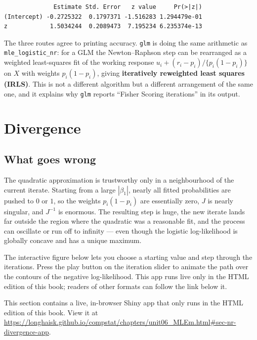 \documentclass[
  letterpaper,
  DIV=11,
  numbers=noendperiod]{scrreprt}
\begin{document}
\begin{verbatim}
              Estimate Std. Error   z value     Pr(>|z|)
(Intercept) -0.2725322  0.1797371 -1.516283 1.294479e-01
z            1.5034244  0.2089473  7.195234 6.235374e-13
\end{verbatim}

The three routes agree to printing accuracy. \texttt{glm} is doing the
same arithmetic as \texttt{mle\_logistic\_nr}: for a GLM the
Newton--Raphson step can be rearranged as a weighted least-squares fit
of the working response \(u_i + (r_i - p_i)/\{p_i(1-p_i)\}\) on \(X\)
with weights \(p_i(1-p_i)\), giving \textbf{iteratively reweighted least
squares (IRLS)}. This is not a different algorithm but a different
arrangement of the same one, and it explains why \texttt{glm} reports
``Fisher Scoring iterations'' in its output.

\section{Divergence}\label{sec-divergence}

\subsection{What goes wrong}\label{what-goes-wrong}

The quadratic approximation is trustworthy only in a neighbourhood of
the current iterate. Starting from a large \(|\beta_1|\), nearly all
fitted probabilities are pushed to \(0\) or \(1\), so the weights
\(p_i(1-p_i)\) are essentially zero, \(J\) is nearly singular, and
\(J^{-1}\) is enormous. The resulting step is huge, the new iterate
lands far outside the region where the quadratic was a reasonable fit,
and the process can oscillate or run off to infinity --- even though the
logistic log-likelihood is globally concave and has a unique maximum.

The interactive figure below lets you choose a starting value and step
through the iterations. Press the play button on the iteration slider to
animate the path over the contours of the negative log-likelihood. This
app runs live only in the HTML edition of this book; readers of other
formats can follow the link below it.

\protect{}\label{sec-nr-divergence-app}{}

This section contains a live, in-browser Shiny app that only runs in the
HTML edition of this book. View it at
\url{https://longhaisk.github.io/compstat/chapters/unit06_MLEm.html\#sec-nr-divergence-app}.
\end{document}

